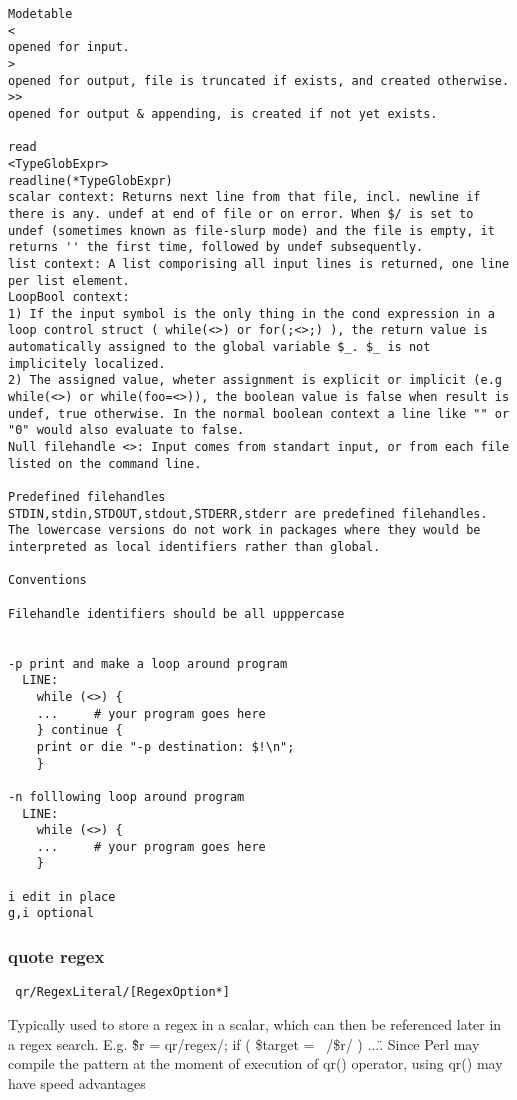 \documentclass{article}
\begin{document}
\begin{description}
{\begin{verbatim}
Modetable
<
opened for input. 
>
opened for output, file is truncated if exists, and created otherwise.
>>
opened for output & appending, is created if not yet exists.

read
<TypeGlobExpr>
readline(*TypeGlobExpr)
scalar context: Returns next line from that file, incl. newline if there is any. undef at end of file or on error. When $/ is set to undef (sometimes known as file-slurp mode) and the file is empty, it returns '' the first time, followed by undef subsequently.
list context: A list comporising all input lines is returned, one line per list element. 
LoopBool context: 
1) If the input symbol is the only thing in the cond expression in a loop control struct ( while(<>) or for(;<>;) ), the return value is automatically assigned to the global variable $_. $_ is not implicitely localized. 
2) The assigned value, wheter assignment is explicit or implicit (e.g while(<>) or while(foo=<>)), the boolean value is false when result is undef, true otherwise. In the normal boolean context a line like "" or "0" would also evaluate to false.
Null filehandle <>: Input comes from standart input, or from each file listed on the command line. 

Predefined filehandles
STDIN,stdin,STDOUT,stdout,STDERR,stderr are predefined filehandles. The lowercase versions do not work in packages where they would be interpreted as local identifiers rather than global.

Conventions

Filehandle identifiers should be all upppercase


-p print and make a loop around program
  LINE:
    while (<>) {
    ...     # your program goes here
    } continue {
    print or die "-p destination: $!\n";
    }

-n folllowing loop around program
  LINE:
    while (<>) {
    ...     # your program goes here
    }

i edit in place
g,i optional
\end{verbatim}

\subsubsection{quote regex} 

\begin{verbatim}
 qr/RegexLiteral/[RegexOption*]
\end{verbatim}

Typically used to store a regex in a scalar, which can then be referenced later
in a regex search. E.g. \"\$r = qr/regex/; if ( \$target =~ /\$r/ ) ...\". Since
Perl may compile the pattern at the moment of execution of qr() operator, using
qr() may have speed advantages

}
\end{description}
\end{document}
